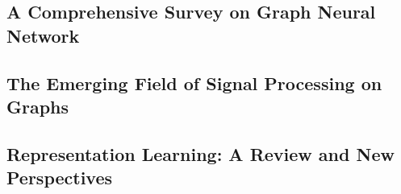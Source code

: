 \subsection{A Comprehensive Survey on Graph Neural Network}


\subsection{The Emerging Field of Signal Processing on Graphs}


\subsection{Representation Learning: A Review and New Perspectives}
